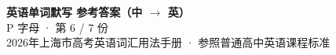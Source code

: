 \documentclass[10pt,a4paper]{article}
\begin{document}
\pagestyle{plain}

\begin{center}
{\LARGE\bfseries 英语单词默写 \quad 参考答案（中 $\to$ 英）}\\[0.22em]
{\large P 字母 · 第 6 / 7 份}\\[0.18em]
{\small 2026年上海市高考英语词汇用法手册 · 参照普通高中英语课程标准}
\end{center}

\vspace{0.2em}
\noindent{\color{rulegray}\rule{\textwidth}{0.8pt}}

\vspace{0.35em}

\vspace{0.25em}
\renewcommand{\arraystretch}{1.32}
\end{document}
